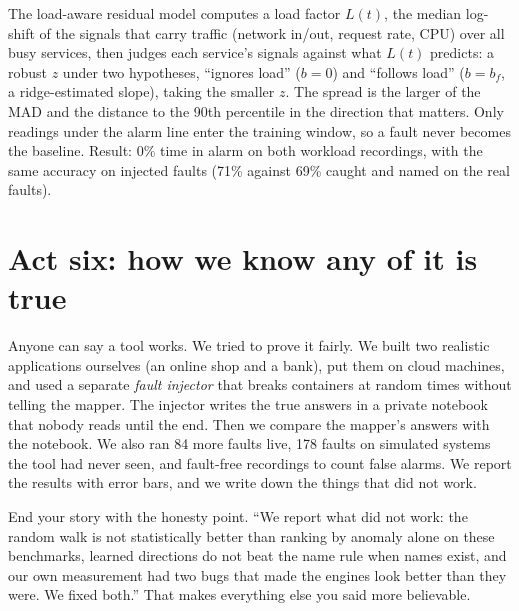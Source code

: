 \begin{techbox}
The load-aware residual model computes a load factor $L(t)$, the median log-shift of the signals that carry traffic (network in/out, request rate, CPU) over all busy services, then judges each service's signals against what $L(t)$ predicts: a robust $z$ under two hypotheses, ``ignores load'' ($b=0$) and ``follows load'' ($b=b_f$, a ridge-estimated slope), taking the smaller $z$. The spread is the larger of the MAD and the distance to the 90th percentile in the direction that matters. Only readings under the alarm line enter the training window, so a fault never becomes the baseline. Result: 0\% time in alarm on both workload recordings, with the same accuracy on injected faults (71\% against 69\% caught and named on the real faults).
\end{techbox}

\section{Act six: how we know any of it is true}
\begin{simplebox}
Anyone can say a tool works. We tried to prove it fairly. We built two realistic applications ourselves (an online shop and a bank), put them on cloud machines, and used a separate \emph{fault injector} that breaks containers at random times without telling the mapper. The injector writes the true answers in a private notebook that nobody reads until the end. Then we compare the mapper's answers with the notebook. We also ran 84 more faults live, 178 faults on simulated systems the tool had never seen, and fault-free recordings to count false alarms. We report the results with error bars, and we write down the things that did not work.
\end{simplebox}

\begin{saybox}
End your story with the honesty point. ``We report what did not work: the random walk is not statistically better than ranking by anomaly alone on these benchmarks, learned directions do not beat the name rule when names exist, and our own measurement had two bugs that made the engines look better than they were. We fixed both.'' That makes everything else you said more believable.
\end{saybox}
